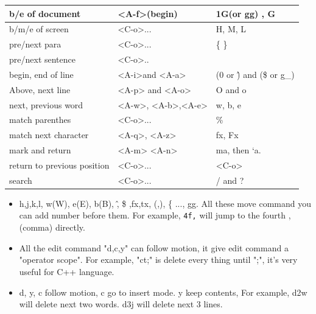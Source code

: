 \documentclass[a4paper,12pt,twoside]{book}
\begin{document}
\begin{itemize}
\begin{center}
\begin{tabular}{p{}|p{}|p{}}
		\hline
		b/e of document &  <A-f>(begin)  & 1G(or gg) , G  \\

	    \hline 
		b/m/e of screen & <C-o>... & H, M, L \\

		\hline 
		pre/next para & <C-o>... &\{ \} \\

		\hline 

		pre/next sentence & <C-o>.. & \( \) \\
		
		\hline 
		begin, end of line &<A-i>and <A-a> & (0 or \^) and (\$ or g\_)  \\
		

        \hline 
        Above, next line &<A-p> and <A-o> & O and o\\

	   	\hline 		
	     next, previous word &<A-w>, <A-b>,<A-e>  & w, b, e\\   
		 
         \hline 		
         match parenthes & <C-o>... & \%   \\
         
         \hline match next character &<A-q>, <A-z>& fx, Fx \\
         
        \hline mark and return & <A-m> <A-n> & ma, then `a. \\
        
        \hline return to previous position & <C-o>... & <C-o> \\    
      				
		\hline
        search &<C-o>...  & / and ? \\
       \hline       
\end{tabular}

\begin{itemize}

		\item h,j,k,l, w(W), e(E), b(B), \^ , \$ ,fx,tx, (,), \{ ..., gg. All these move command you can add number before them. For example, \verb=4f,= will jump to the fourth ,(comma) directly.    
		

				\item All the edit command "d,c,y" can follow motion, it give edit command a "operator scope". For example, "ct;" is delete every thing until ";", it's very useful for C++ language. 

				\item d, y, c follow motion, c go to insert mode. y keep contents, For example, d2w will delete next two words. d3j will delete next 3 lines.


\end{itemize}
\end{center}
\end{itemize}
\end{document}
